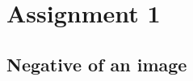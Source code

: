 \documentclass[a4paper,16pt]{article}
\begin{document}
	{
		
		\doublespacing
		
		{
			\renewcommand\contentsname{\Huge Contents}
			\renewcommand\cftsubsecfont{\large}
			
			\doublespacing
			\tableofcontents
		}
	}
	\newpage
	
	\section{Assignment 1}
	\vspace{0.2in}
	\subsection{Negative of an image}
	\indent	
	\vspace{1in}
\end{document}
